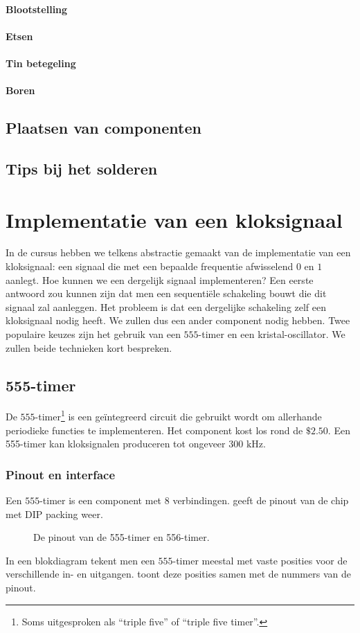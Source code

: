 \paragraph{Blootstelling}
\paragraph{Etsen}
\paragraph{Tin betegeling}
\paragraph{Boren}
\subsection{Plaatsen van componenten}
\subsection{Tips bij het solderen}
\section{Implementatie van een kloksignaal}
In de cursus hebben we telkens abstractie gemaakt van de implementatie van een kloksignaal: een signaal die met een bepaalde frequentie afwisselend $0$ en $1$ aanlegt. Hoe kunnen we een dergelijk signaal implementeren? Een eerste antwoord zou kunnen zijn dat men een sequenti\"ele schakeling bouwt die dit signaal zal aanleggen. Het probleem is dat een dergelijke schakeling zelf een kloksignaal nodig heeft. We zullen dus een ander component nodig hebben. Twee populaire keuzes zijn het gebruik van een $555$-timer en een kristal-oscillator. We zullen beide technieken kort bespreken.
\subsection{555-timer}
De $555$-timer\footnote{Soms uitgesproken als ``triple five'' of ``triple five timer''.} is een ge\"integreerd circuit die gebruikt wordt om allerhande periodieke functies te implementeren. Het component kost los rond de $\$ 2.50$. Een 555-timer kan kloksignalen produceren tot ongeveer $300\mbox{ kHz}$.
\subsubsection{Pinout en interface}
Een $555$-timer is een component met $8$ verbindingen.  geeft de pinout van de chip met DIP packing weer.
\begin{figure}[hbt]
\centering
{}
\caption{De pinout van de 555-timer en 556-timer.}
\end{figure}
In een blokdiagram tekent men een $555$-timer meestal met vaste posities voor de verschillende in- en uitgangen.  toont deze posities samen met de nummers van de pinout.
